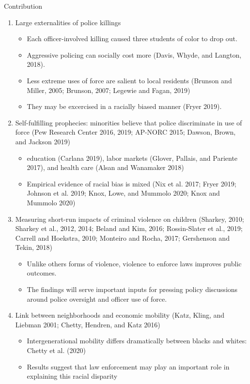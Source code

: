 \documentclass[dvipdfmx]{beamer}
\begin{document}
\begin{frame}{Contribution}
  \begin{enumerate}
    \item Large externalities of police killings 
    \begin{itemize}
      \item Each officer-involved killing caused three students of color to drop out.
      \item Aggressive policing can socially cost more (Davis, Whyde, and Langton, 2018).
      \item Less extreme uses of force are salient to local residents (Brunson and Miller, 2005; Brunson, 2007; Legewie and Fagan, 2019)
      \item They may be excercised in a racially biased manner (Fryer
      2019).
    \end{itemize}
    \item Self-fulfilling prophecies: minorities believe that police discriminate in use of force (Pew Research Center
    2016, 2019; AP-NORC 2015; Dawson, Brown, and Jackson 2019)
    \begin{itemize}
      \item education (Carlana 2019), labor markets
      (Glover, Pallais, and Pariente 2017), and health care (Alsan and Wanamaker 2018)
      \item Empirical evidence of racial bias is mixed (Nix et al. 2017; Fryer 2019; Johnson et al. 2019; Knox, Lowe, and Mummolo 2020; Knox and Mummolo 2020)
    \end{itemize}
  \end{enumerate}
\end{frame}

\begin{frame}{}
  \begin{enumerate}
    \setcounter{enumi}{2}
    \item Measuring short-run impacts of criminal violence on children (Sharkey, 2010; Sharkey et al., 2012, 2014; Beland and Kim, 2016; Rossin-Slater et al., 2019; Carrell and Hoekstra, 2010; Monteiro and Rocha, 2017; Gershenson and Tekin, 2018)
    \begin{itemize}
      \item Unlike others forms of violence, violence to enforce laws improves public outcomes.
      \item The findings will serve important inputs for pressing policy discussions around police oversight and officer use of force.
    \end{itemize}
    \item Link between neighborhoods and economic mobility (Katz, Kling, and Liebman 2001; Chetty, Hendren, and Katz 2016)
    \begin{itemize}
      \item Intergenerational mobility differs dramatically between blacks and whites: Chetty et al. (2020)
      \item Results suggest that law enforcement may
      play an important role in explaining this racial disparity
    \end{itemize}
  \end{enumerate}
\end{frame}
\end{document}
